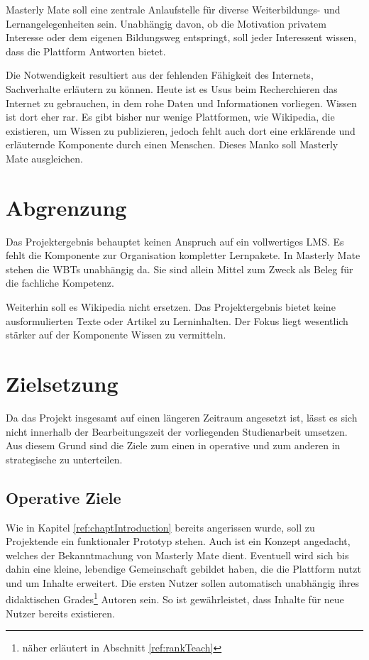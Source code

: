 Masterly Mate soll eine zentrale Anlaufstelle für diverse Weiterbildungs- und
Lernangelegenheiten sein. Unabhängig davon, ob die Motivation privatem Interesse
oder dem eigenen Bildungsweg entspringt, soll jeder Interessent wissen, dass
die Plattform Antworten bietet.

Die Notwendigkeit resultiert aus der fehlenden Fähigkeit des Internets,
Sachverhalte erläutern zu können. Heute ist es Usus beim Recherchieren das
Internet zu gebrauchen, in dem rohe Daten und Informationen vorliegen. Wissen
ist dort eher rar. Es gibt bisher nur wenige Plattformen, wie Wikipedia, die
existieren, um Wissen zu publizieren, jedoch fehlt auch dort eine erklärende und
erläuternde Komponente durch einen Menschen. Dieses Manko soll Masterly Mate
ausgleichen.

\section{Abgrenzung}
Das Projektergebnis behauptet keinen Anspruch auf ein vollwertiges \ac{LMS}. Es
fehlt die Komponente zur Organisation kompletter Lernpakete. In Masterly Mate
stehen die WBTs unabhängig da. Sie sind allein Mittel zum Zweck als Beleg für
die fachliche Kompetenz.

Weiterhin soll es Wikipedia nicht ersetzen. Das Projektergebnis bietet keine
ausformulierten Texte oder Artikel zu Lerninhalten. Der Fokus liegt wesentlich
stärker auf der Komponente Wissen zu vermitteln.

\section{Zielsetzung}
Da das Projekt insgesamt auf einen längeren Zeitraum angesetzt ist, lässt es
sich nicht innerhalb der Bearbeitungszeit der vorliegenden Studienarbeit
umsetzen. Aus diesem Grund sind die Ziele zum einen in operative und zum anderen
in strategische zu unterteilen. 

\subsection{Operative Ziele}
Wie in Kapitel \ref{ref:chaptIntroduction} bereits angerissen wurde, soll zu
Projektende ein funktionaler Prototyp stehen. Auch ist ein Konzept angedacht,
welches der Bekanntmachung von Masterly Mate dient. Eventuell wird sich bis
dahin eine kleine, lebendige Gemeinschaft gebildet haben, die die Plattform
nutzt und um Inhalte erweitert. Die ersten Nutzer sollen automatisch unabhängig
ihres didaktischen Grades\footnote{näher erläutert in Abschnitt
\ref{ref:rankTeach}} Autoren sein. So ist gewährleistet, dass Inhalte für neue
Nutzer bereits existieren. 

